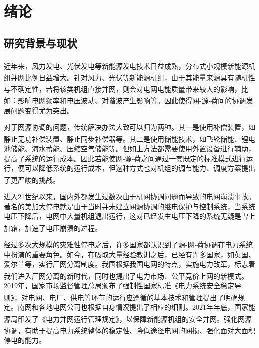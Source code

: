 \documentclass[winfonts,UTF8,a4paper]{ctexart}
\newcommand{\upcite}[1]{{\textsuperscript{\cite{#1}}}}
\begin{document}
    
    
    \tableofcontents
 \thispagestyle{empty}
 \newpage


\pagestyle{fancy}
\fancyhf{}
\fancyfoot[R]{\thepage}
\setcounter{page}{1}
\newpage
\section{绪论}
\subsection{研究背景与现状}
近年来，风力发电、光伏发电等新能源发电技术日益成熟\upcite{田皓2021基于趋势理论的源}，分布式小规模新能源机组并网比例日益增大\upcite{陈锴2020考虑输电断面限制的风,宋杰2021蓄热式电采暖负荷参与风电消纳运行策略研究}。针对风力、光伏等新能源机组，由于其能量来源具有随机性与不确定性\upcite{高阳2010基于噪声场合下}，若将该类机组直接并网，则会对电网电能质量带来较大的影响，比如：影响电网频率和电压波动、对谐波产生影响等\upcite{郭俊飞2015探讨风电场并网运行对电网电能质量的影响}。因此使得网-源-荷间的协调发展问题变得尤为突出。

对于网源协调的问题，传统解决办法大致可以归为两种。其一是使用补偿装置，如静止无功补偿装置、静止同步补偿器等\upcite{田广青1995静止无功补偿技术与应用,田广青1996静止无功补偿技术与应用}。其二是使用储能技术\upcite{周皓2021改善风电并网电能质量的飞轮储能系统能量管理系统设计,张维煜2014飞轮储能关键技术及其发展现状,李军徽201810,沈冠冶2018考虑风电并网系统的储能优化配置}，如飞轮储能、锂电池储能、海水蓄能、压缩空气储能等。但如上方法都需要使用外置设备进行辅助，提高了系统的运行成本。因此若能使网-源-荷之间通过一套既定的标准模式进行运行，便可以降低系统的运行成本，但这种方式也对机组的调节能力、调度方案提出了更严峻的挑战\upcite{ma2019parameter}。

进入21世纪以来，国内外都发生过数次由于机网协调问题而导致的电网崩溃事故。著名的美加大停电就是由于当时并未建立网源协调的继电保护与控制系统，当系统电压下降后，电网中大量机组退出运行，这对已经发生电压下降的系统无疑是雪上加霜，加速了电压崩溃的过程\upcite{印永华2003美加,王景瑞2004整饬电力市场资源秩序}。

经过多次大规模的灾难性停电之后，许多国家都认识到了源-网-荷协调在电力系统中扮演的重要角色。如今，在吸取大量经验教训之后，已经有许多国家，如英国、爱尔兰等，实行厂网分离制度。我国根据我国电网的特点，实施电力改革，标志着我们进入厂网分离的新时代，同时也提出了电力市场、公平竞价上网的新模式\upcite{丁晓冬2015热电联产机组间热电负荷优化分配的研究}。2019年，国家市场监督管理总局颁布了强制性国家标准《电力系统安全稳定导则》\upcite{电力系统安全稳定导则}，对电网、电厂、供电等环节的运行应遵循的基本技术和管理提出了明确规定。南网和各地电网公司也根据自身情况提出了相应的细则。2021年年底，国家能源局印发了《电力并网运行管理规定》\upcite{电力并网运行管理规定}，以保障新能源机组的安全并网。强化网源协调，有助于提高电力系统整体的稳定性、降低途径电网的网损\upcite{陈征2016荷}、强化面对大面积停电的能力。
\end{document}
